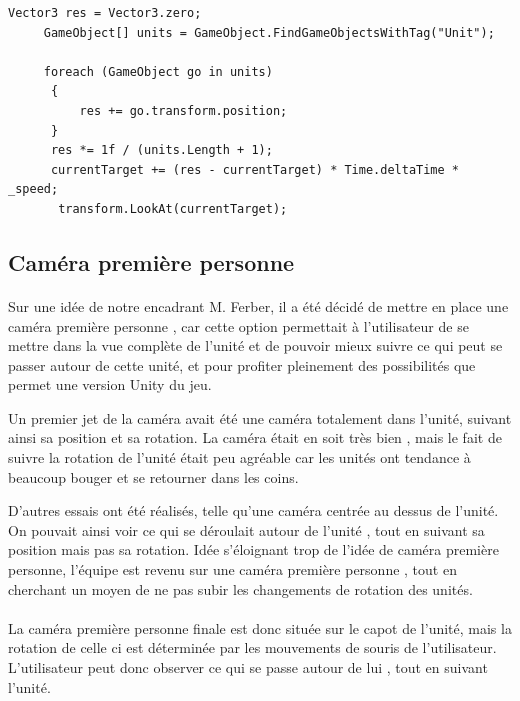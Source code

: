 \documentclass{report}
\begin{document}
\begin{lstlisting}[frame=single]
     Vector3 res = Vector3.zero;
     GameObject[] units = GameObject.FindGameObjectsWithTag("Unit");

     foreach (GameObject go in units)
      {
          res += go.transform.position;
      }
      res *= 1f / (units.Length + 1);
      currentTarget += (res - currentTarget) * Time.deltaTime * _speed;
       transform.LookAt(currentTarget);
\end{lstlisting}

\subsection{Caméra première personne}
\paragraph{}

Sur une idée de notre encadrant M. Ferber, il a été décidé de mettre en place une caméra première personne , car cette option permettait à l’utilisateur de se mettre dans la vue complète de l’unité et de pouvoir mieux suivre ce qui peut se passer autour de cette unité, et pour profiter pleinement des possibilités que permet une version Unity du jeu. \newline

Un premier jet de la caméra avait été une caméra totalement dans l’unité, suivant ainsi sa position et sa rotation. La caméra était en soit très bien , mais le fait de suivre la rotation de l’unité était peu agréable car les unités ont tendance à beaucoup bouger et se retourner dans les coins. 

D’autres essais ont été réalisés, telle qu’une caméra centrée au dessus de l’unité. On pouvait ainsi voir ce qui se déroulait autour de l’unité , tout en suivant sa position mais pas sa rotation. Idée s’éloignant trop de l’idée de caméra première personne, l’équipe est revenu sur une caméra première personne , tout en cherchant un moyen de ne pas subir les changements de rotation des unités. 
\paragraph{}
La caméra première personne finale est donc située sur le capot de l’unité, mais la rotation de celle ci est déterminée par les mouvements de souris de l’utilisateur. L’utilisateur peut donc observer ce qui se passe autour de lui , tout en suivant l’unité. 
\end{document}
